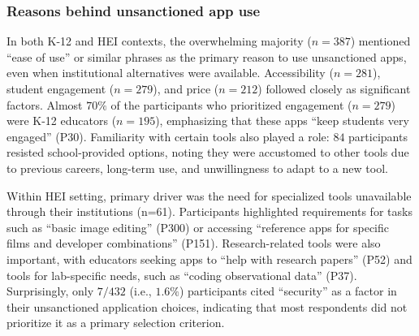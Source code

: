 
\subsubsection{Reasons behind unsanctioned app use}
\label{reasons_unsanctioned_app_use}
In both K-12 and HEI contexts, the overwhelming majority ($n=387$) mentioned ``ease of use'' or similar phrases as the primary reason to use unsanctioned apps, even when institutional alternatives were available. 
Accessibility ($n=281$), student engagement ($n=279$), and price ($n=212$) followed closely as significant factors. 
%
Almost $70\%$ of the participants who prioritized engagement ($n=279$) were K-12 educators ($n=195$), emphasizing that these apps ``keep students very engaged'' (P30).
Familiarity with certain tools also played a role: $84$ participants resisted school-provided options, noting they were accustomed to other tools due to previous careers, long-term use, and unwillingness to adapt to a new tool.


Within HEI setting, primary driver was the need for specialized tools unavailable through their institutions (n=61). 
Participants highlighted requirements for tasks such as ``basic image editing'' (P300) or accessing ``reference apps for specific films and developer combinations'' (P151). 
Research-related tools were also important, with educators seeking apps to ``help with research papers'' (P52) and tools for lab-specific needs, such as ``coding observational data'' (P37).
%
%
Surprisingly, only $7/432$ (i.e., $1.6\%$) participants cited ``security'' as a factor in their unsanctioned application choices, indicating that most respondents did not prioritize it as a primary selection criterion.


